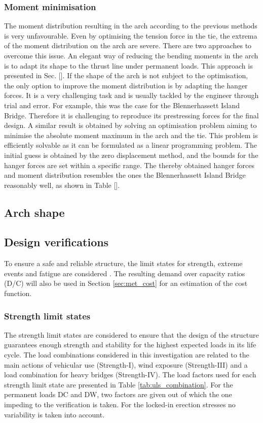 \subsubsection{Moment minimisation}
The moment distribution resulting in the arch according to the previous methods is very unfavourable. Even by optimising the tension force in the tie, the extrema of the moment distribution on the arch are severe. There are two approaches to overcome this issue. An elegant way of reducing the bending moments in the arch is to adapt its shape to the thrust line under permanent loads. This approach is presented in Sec. []. If the shape of the arch is not subject to the optimisation, the only option to improve the moment distribution is by adapting the hanger forces. It is a very challenging task and is usually tackled by the engineer through trial and error. For example, this was the case for the Blennerhassett Island Bridge. Therefore it is challenging to reproduce its prestressing forces for the final design. A similar result is obtained by solving an optimisation problem aiming to minimise the absolute moment maximum in the arch and the tie. This problem is efficiently solvable as it can be formulated as a linear programming problem. The initial guess is obtained by the zero displacement method, and the bounds for the hanger forces are set within a specific range.  The thereby obtained hanger forces and moment distribution resembles the ones the Blennerhassett Island Bridge reasonably well, as shown in Table [].

\subsection{Arch shape} \label{sec:met_arch}

\newpage
\subsection{Design verifications} \label{sec:met_ver}
To ensure a safe and reliable structure, the limit states for strength, extreme events and fatigue are considered \citep{AASHTO}.  The resulting demand over capacity ratios (D/C) will also be used in Section \ref{sec:met_cost} for an estimation of the cost function.

\subsubsection{Strength limit states}
The strength limit states are considered to ensure that the design of the structure guarantees enough strength and stability for the highest expected loads in its life cycle. The load combinations considered in this investigation are related to the main actions of vehicular use (Strength-I), wind exposure (Strength-III) and a load combination for heavy bridges (Strength-IV). The load factors used for each strength limit state are presented in Table \ref{tab:uls_combination}. For the permanent loads DC and DW, two factors are given out of which the one impeding to the verification is taken. For the locked-in erection stresses no variability is taken into account.


